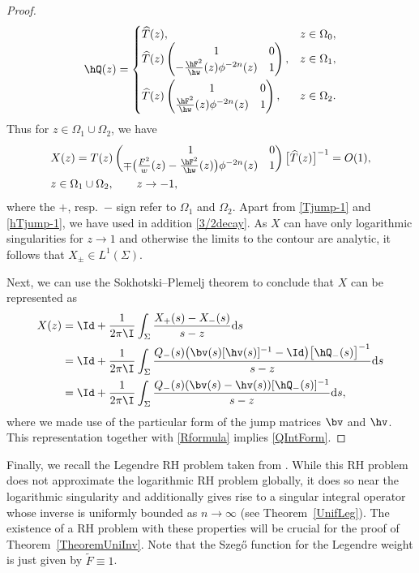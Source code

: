 \begin{proof}
\begin{align*}
 \hQ(z) =
\begin{cases}
\widehat T(z), & z \in \Omega_0,
\\
\widehat T(z)
\begin{pmatrix}
1 & 0
\\
-\frac{\hF^2}{\hw}(z) \phi^{-2n}(z) & 1
\end{pmatrix},
& z \in \Omega_1,\vspace{1mm}
\\
\widehat T(z)
\begin{pmatrix}
1 & 0
\\
\frac{\hF^2}{\hw}(z) \phi^{-2n}(z) & 1
\end{pmatrix},& z \in \Omega_2.
\end{cases}
\end{align*}
Thus for $z\in \Omega_1\cup \Omega_2$, we have
\begin{align*}
 &X(z) = T(z)
 \begin{pmatrix}
 1 & 0
 \\
 \mp\big(\frac{F^2}{w}(z)-\frac{\hF^2}{\hw}(z)\big) \phi^{-2n}(z) & 1
 \end{pmatrix}
 \big[\widehat T(z)\big]^{-1} = O(1),
 \\
 &z\in \Omega_1\cup\Omega_2, \qquad z\to-1,
\end{align*}
where the $+$, resp.\ $-$ sign refer to $\Omega_1$ and $\Omega_2$. Apart from \eqref{Tjump-1} and \eqref{hTjump-1}, we have used in addition \eqref{3/2decay}. As $X$ can have only logarithmic singularities for $z \to 1$ and otherwise the limits to the contour are analytic, it follows that $X_\pm \in L^1(\Sigma)$.

Next, we can use the Sokhotski--Plemelj theorem to conclude that $X$ can be represented as
\begin{align*}
 X(z) &= \Id + \frac{1}{2\pi \I}\int_\Sigma \frac{X_+(s)-X_-(s)}{s-z} {\rm d}s
 \\
 &= \Id + \frac{1}{2\pi \I}\int_\Sigma \frac{Q_-(s)\big(\bv(s)[\hv(s)]^{-1}-\Id\big)\big[\hQ_-(s)\big]^{-1}}{s-z} {\rm d}s
 \\
 &= \Id + \frac{1}{2\pi \I}\int_\Sigma \frac{Q_-(s)(\bv(s)-\hv(s))[\hQ_-(s)]^{-1}}{s-z} {\rm d}s,
\end{align*}
where we made use of the particular form of the jump matrices $\bv$ and $\hv$. This representation together with \eqref{Rformula} implies \eqref{QIntForm}.
\end{proof}

Finally, we recall the Legendre RH problem taken from \cite[Section~3.4]{CD}. While this RH problem does not approximate the logarithmic RH problem globally, it does so near the logarithmic singularity and additionally gives rise to a singular integral operator whose inverse is uniformly bounded as $n \to \infty$ (see Theorem~\ref{UnifLeg}). The existence of a RH problem with these properties will be crucial for the proof of Theorem~\ref{TheoremUniInv}. Note that the Szeg\H{o} function for the Legendre weight is just given by $\widetilde F \equiv 1$.


